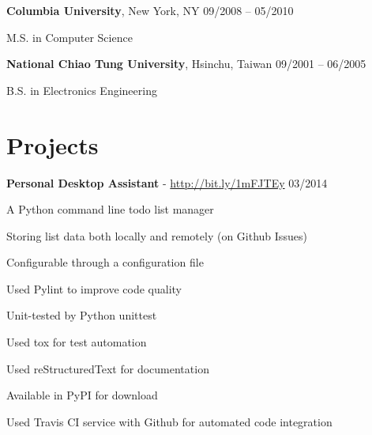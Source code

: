 \documentclass[margin,line]{resume}
\begin{document}
\begin{resume}
    \textbf{Columbia University}, New York, NY \hfill 09/2008 -- 05/2010 \vspace{-3mm}\\\vspace{-1mm}%
      \begin{list2}
       \item M.S. in Computer Science
      \end{list2}
 
    \textbf{National Chiao Tung University}, Hsinchu, Taiwan \hfill 09/2001 -- 06/2005 \vspace{-3mm}\\\vspace{-1mm}%
      \begin{list2}
       \item B.S. in Electronics Engineering
      \end{list2}

    \section{\mysidestyle Projects}

    \textbf{Personal Desktop Assistant} - \url{http://bit.ly/1mFJTEy} \hfill 03/2014 \vspace{-3mm}\\\vspace{-1mm}%
      \begin{list2}
       \item A Python command line todo list manager
       \item Storing list data both locally and remotely (on Github Issues)
       \item Configurable through a configuration file
       \item Used Pylint to improve code quality
       \item Unit-tested by Python unittest
       \item Used tox for test automation
       \item Used reStructuredText for documentation
       \item Available in PyPI for download
       \item Used Travis CI service with Github for automated code integration
      \end{list2}


\end{resume}
\end{document}
